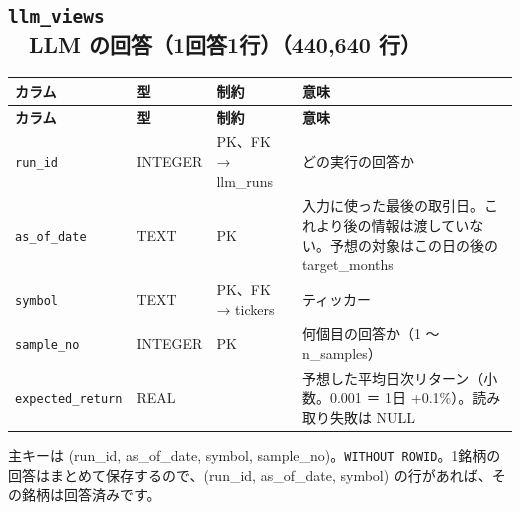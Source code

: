 \documentclass[xelatex,ja=standard,jafont=hiragino-pron,a4paper,10pt]{bxjsreport}
\begin{document}
\subsection*{\texttt{llm\_\allowbreak{}views}　LLM の回答（1回答1行）（440,640 行）}
{\footnotesize
\begin{longtable}{p{3.30cm}p{1.40cm}p{3.00cm}p{6.40cm}}
\toprule
\textbf{カラム} & \textbf{型} & \textbf{制約} & \textbf{意味} \\
\midrule
\endfirsthead
\toprule
\textbf{カラム} & \textbf{型} & \textbf{制約} & \textbf{意味} \\
\midrule
\endhead
\bottomrule
\endfoot
\texttt{run\_\allowbreak{}id} & INTEGER & PK、FK → llm\_runs & どの実行の回答か \\
\texttt{as\_\allowbreak{}of\_\allowbreak{}date} & TEXT & PK & 入力に使った最後の取引日。これより後の情報は渡していない。予想の対象はこの日の後の target\_months \\
\texttt{symbol} & TEXT & PK、FK → tickers & ティッカー \\
\texttt{sample\_\allowbreak{}no} & INTEGER & PK & 何個目の回答か（1 〜 n\_samples） \\
\texttt{expected\_\allowbreak{}return} & REAL &  & 予想した平均日次リターン（小数。0.001 ＝ 1日 +0.1\%）。読み取り失敗は NULL \\
\end{longtable}
}
{\small 主キーは (run\_id, as\_of\_date, symbol, sample\_no)。\texttt{WITHOUT ROWID}。1銘柄の回答はまとめて保存するので、(run\_id, as\_of\_date, symbol) の行があれば、その銘柄は回答済みです。\par}
\medskip
\end{document}
